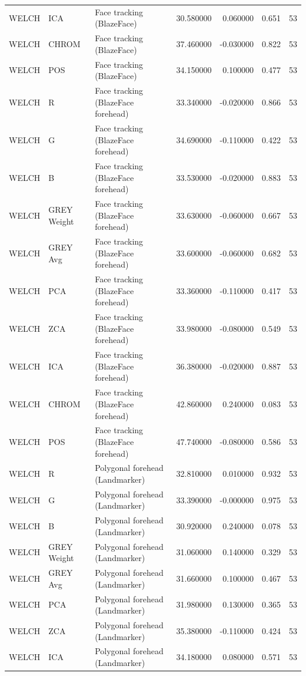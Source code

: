 \begin{table}[htbp]
\begin{tabular}{l l l r r l r}
WELCH & ICA & Face tracking (BlazeFace) & 30.580000 & 0.060000 & 0.651 & 53 \\
WELCH & CHROM & Face tracking (BlazeFace) & 37.460000 & -0.030000 & 0.822 & 53 \\
WELCH & POS & Face tracking (BlazeFace) & 34.150000 & 0.100000 & 0.477 & 53 \\
WELCH & R & Face tracking (BlazeFace forehead) & 33.340000 & -0.020000 & 0.866 & 53 \\
WELCH & G & Face tracking (BlazeFace forehead) & 34.690000 & -0.110000 & 0.422 & 53 \\
WELCH & B & Face tracking (BlazeFace forehead) & 33.530000 & -0.020000 & 0.883 & 53 \\
WELCH & GREY Weight & Face tracking (BlazeFace forehead) & 33.630000 & -0.060000 & 0.667 & 53 \\
WELCH & GREY Avg & Face tracking (BlazeFace forehead) & 33.600000 & -0.060000 & 0.682 & 53 \\
WELCH & PCA & Face tracking (BlazeFace forehead) & 33.360000 & -0.110000 & 0.417 & 53 \\
WELCH & ZCA & Face tracking (BlazeFace forehead) & 33.980000 & -0.080000 & 0.549 & 53 \\
WELCH & ICA & Face tracking (BlazeFace forehead) & 36.380000 & -0.020000 & 0.887 & 53 \\
WELCH & CHROM & Face tracking (BlazeFace forehead) & 42.860000 & 0.240000 & 0.083 & 53 \\
WELCH & POS & Face tracking (BlazeFace forehead) & 47.740000 & -0.080000 & 0.586 & 53 \\
WELCH & R & Polygonal forehead (Landmarker) & 32.810000 & 0.010000 & 0.932 & 53 \\
WELCH & G & Polygonal forehead (Landmarker) & 33.390000 & -0.000000 & 0.975 & 53 \\
WELCH & B & Polygonal forehead (Landmarker) & 30.920000 & 0.240000 & 0.078 & 53 \\
WELCH & GREY Weight & Polygonal forehead (Landmarker) & 31.060000 & 0.140000 & 0.329 & 53 \\
WELCH & GREY Avg & Polygonal forehead (Landmarker) & 31.660000 & 0.100000 & 0.467 & 53 \\
WELCH & PCA & Polygonal forehead (Landmarker) & 31.980000 & 0.130000 & 0.365 & 53 \\
WELCH & ZCA & Polygonal forehead (Landmarker) & 35.380000 & -0.110000 & 0.424 & 53 \\
WELCH & ICA & Polygonal forehead (Landmarker) & 34.180000 & 0.080000 & 0.571 & 53 \\

\end{tabular}
\end{table}
